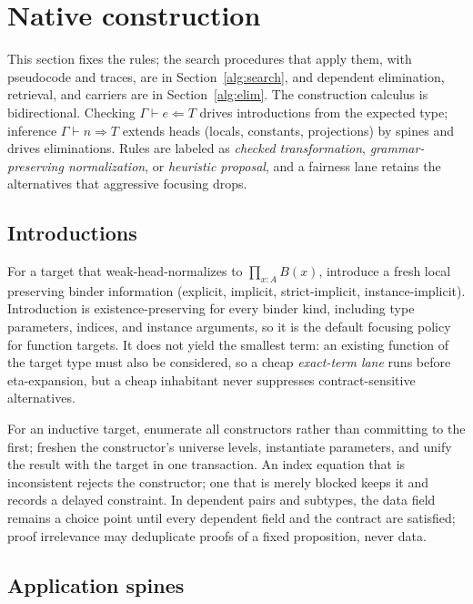 \section{Native construction}\label{sec:construction}

This section fixes the rules; the search procedures that apply them, with pseudocode and traces, are in Section~\ref{alg:search}, and dependent elimination, retrieval, and carriers are in Section~\ref{alg:elim}. The construction calculus is bidirectional. Checking $\Gamma \vdash e \Leftarrow T$ drives introductions from the expected type; inference $\Gamma \vdash n \Rightarrow T$ extends heads (locals, constants, projections) by spines and drives eliminations. Rules are labeled as \emph{checked transformation}, \emph{grammar-preserving normalization}, or \emph{heuristic proposal}, and a fairness lane retains the alternatives that aggressive focusing drops.

\subsection{Introductions}

For a target that weak-head-normalizes to $\prod_{x:A} B(x)$, introduce a fresh local preserving binder information (explicit, implicit, strict-implicit, instance-implicit). Introduction is existence-preserving for every binder kind, including type parameters, indices, and instance arguments, so it is the default focusing policy for function targets. It does not yield the smallest term: an existing function of the target type must also be considered, so a cheap \emph{exact-term lane} runs before eta-expansion, but a cheap inhabitant never suppresses contract-sensitive alternatives.

For an inductive target, enumerate all constructors rather than committing to the first; freshen the constructor's universe levels, instantiate parameters, and unify the result with the target in one transaction. An index equation that is inconsistent rejects the constructor; one that is merely blocked keeps it and records a delayed constraint. In dependent pairs and subtypes, the data field remains a choice point until every dependent field and the contract are satisfied; proof irrelevance may deduplicate proofs of a fixed proposition, never data.

\subsection{Application spines}\label{sec:spines}

